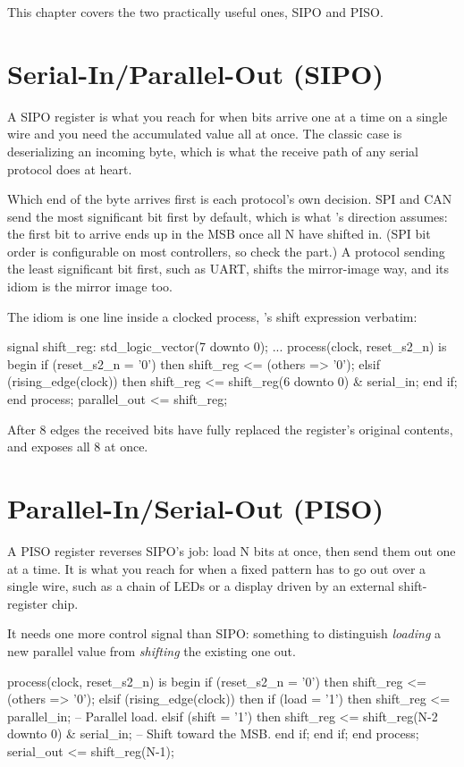 \noindent This chapter covers the two practically useful ones, SIPO and PISO.

\section{Serial-In/Parallel-Out (SIPO)}
\label{c6:a3}
A SIPO register is what you reach for when bits arrive one at a time on a single wire and you need
the accumulated value all at once. The classic case is deserializing an incoming byte, which is
what the receive path of any serial protocol does at heart.

Which end of the byte arrives first is each protocol's own decision. SPI and CAN send the most
significant bit first by default, which is what 's direction assumes: the first bit
to arrive ends up in the MSB once all N have shifted in. (SPI bit order is configurable on most
controllers, so check the part.) A protocol sending the least significant bit first, such as UART,
shifts the mirror-image way, and its idiom is the mirror image too.

The idiom is one line inside a clocked process, 's shift expression verbatim:

\begin{vhdlcode}
signal shift_reg: std_logic_vector(7 downto 0);
...
process(clock, reset_s2_n) is
begin
    if (reset_s2_n = '0') then
        shift_reg <= (others => '0');
    elsif (rising_edge(clock)) then
        shift_reg <= shift_reg(6 downto 0) & serial_in;
    end if;
end process;
parallel_out <= shift_reg;
\end{vhdlcode}

\noindent After 8 edges the received bits have fully replaced the register's original contents,
and  exposes all 8 at once.

\section{Parallel-In/Serial-Out (PISO)}
\label{c6:a4}
A PISO register reverses SIPO's job: load N bits at once, then send them out one at a time. It is
what you reach for when a fixed pattern has to go out over a single wire, such as a chain of LEDs
or a display driven by an external shift-register chip.

It needs one more control signal than SIPO: something to distinguish \emph{loading} a new parallel
value from \emph{shifting} the existing one out.

\begin{vhdlcode}
process(clock, reset_s2_n) is
begin
    if (reset_s2_n = '0') then
        shift_reg <= (others => '0');
    elsif (rising_edge(clock)) then
        if (load = '1') then
            shift_reg <= parallel_in;                          -- Parallel load.
        elsif (shift = '1') then
            shift_reg <= shift_reg(N-2 downto 0) & serial_in;  -- Shift toward the MSB.
        end if;
    end if;
end process;
serial_out <= shift_reg(N-1);
\end{vhdlcode}


